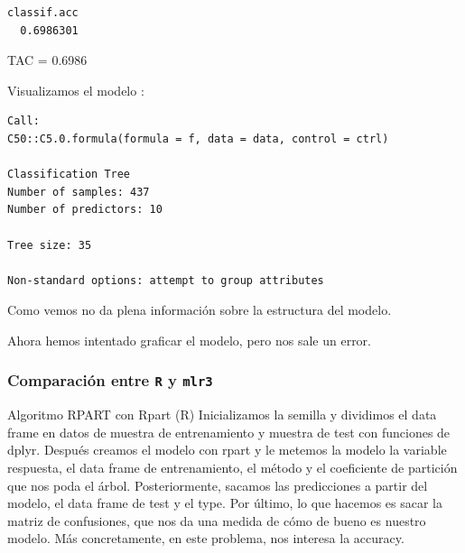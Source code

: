 \documentclass[
  11pt,
  a4paper,
]{article}
\newenvironment{Shaded}{\begin{snugshade}}{\end{snugshade}}
\newcommand{\CommentTok}[1]{\textcolor[rgb]{0.56,0.35,0.01}{\textit{#1}}}
\newcommand{\DecValTok}[1]{\textcolor[rgb]{0.00,0.00,0.81}{#1}}
\newcommand{\NormalTok}[1]{#1}
\newcommand{\OtherTok}[1]{\textcolor[rgb]{0.56,0.35,0.01}{#1}}
\newcommand{\SpecialCharTok}[1]{\textcolor[rgb]{0.00,0.00,0.00}{#1}}
\begin{document}
\begin{verbatim}
classif.acc 
  0.6986301 
\end{verbatim}

TAC = 0.6986

\vspace{0.25cm}

Visualizamos el modelo :

\begin{Shaded}
\end{Shaded}

\begin{verbatim}
Call:
C50::C5.0.formula(formula = f, data = data, control = ctrl)

Classification Tree
Number of samples: 437 
Number of predictors: 10 

Tree size: 35 

Non-standard options: attempt to group attributes
\end{verbatim}

Como vemos no da plena información sobre la estructura del modelo.

Ahora hemos intentado graficar el modelo, pero nos sale un error.

\begin{Shaded}
\end{Shaded}

\newpage

\hypertarget{comparaciuxf3n-entre-r-y-mlr3}{%
\subsubsection{\texorpdfstring{Comparación entre \texttt{R} y
\texttt{mlr3}}{Comparación entre R y mlr3}}\label{comparaciuxf3n-entre-r-y-mlr3}}

Algoritmo RPART con Rpart (R) Inicializamos la semilla y dividimos el
data frame en datos de muestra de entrenamiento y muestra de test con
funciones de dplyr. Después creamos el modelo con rpart y le metemos la
modelo la variable respuesta, el data frame de entrenamiento, el método
y el coeficiente de partición que nos poda el árbol. Posteriormente,
sacamos las predicciones a partir del modelo, el data frame de test y el
type. Por último, lo que hacemos es sacar la matriz de confusiones, que
nos da una medida de cómo de bueno es nuestro modelo. Más concretamente,
en este problema, nos interesa la accuracy.
\end{document}
